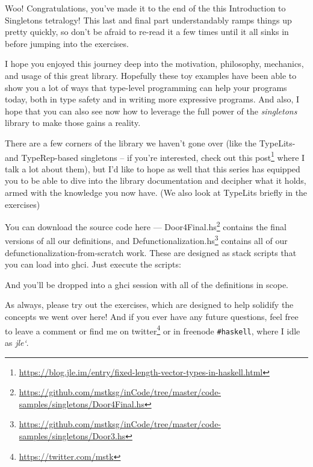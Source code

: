 \documentclass[]{article}
\newenvironment{Shaded}{}{}
\newcommand{\ExtensionTok}[1]{#1}
\newcommand{\NormalTok}[1]{#1}
\newcommand{\OperatorTok}[1]{\textcolor[rgb]{0.40,0.40,0.40}{#1}}
\renewcommand{\href}[2]{#2\footnote{\url{#1}}}
\begin{document}
Woo! Congratulations, you've made it to the end of the this Introduction to
Singletons tetralogy! This last and final part understandably ramps things up
pretty quickly, so don't be afraid to re-read it a few times until it all sinks
in before jumping into the exercises.

I hope you enjoyed this journey deep into the motivation, philosophy, mechanics,
and usage of this great library. Hopefully these toy examples have been able to
show you a lot of ways that type-level programming can help your programs today,
both in type safety and in writing more expressive programs. And also, I hope
that you can also see now how to leverage the full power of the
\emph{singletons} library to make those gains a reality.

There are a few corners of the library we haven't gone over (like the TypeLits-
and TypeRep-based singletons -- if you're interested, check out
\href{https://blog.jle.im/entry/fixed-length-vector-types-in-haskell.html}{this
post} where I talk a lot about them), but I'd like to hope as well that this
series has equipped you to be able to dive into the library documentation and
decipher what it holds, armed with the knowledge you now have. (We also look at
TypeLits briefly in the exercises)

You can download the source code here ---
\href{https://github.com/mstksg/inCode/tree/master/code-samples/singletons/Door4Final.hs}{Door4Final.hs}
contains the final versions of all our definitions, and
\href{https://github.com/mstksg/inCode/tree/master/code-samples/singletons/Door3.hs}{Defunctionalization.hs}
contains all of our defunctionalization-from-scratch work. These are designed as
stack scripts that you can load into ghci. Just execute the scripts:

\begin{Shaded}
\end{Shaded}

And you'll be dropped into a ghci session with all of the definitions in scope.

As always, please try out the exercises, which are designed to help solidify the
concepts we went over here! And if you ever have any future questions, feel free
to leave a comment or find me on \href{https://twitter.com/mstk}{twitter} or in
freenode \texttt{\#haskell}, where I idle as \emph{jle`}.
\end{document}
